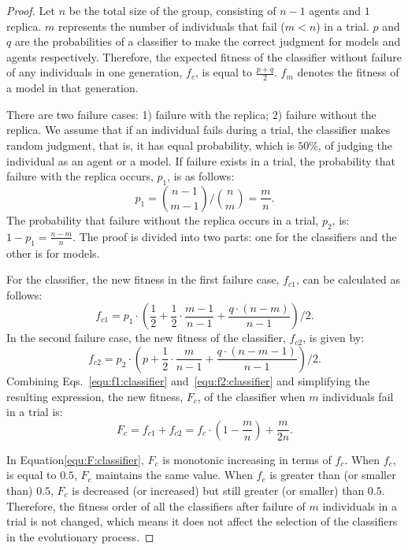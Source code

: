 \begin{proof}
Let $n$ be the total size of the group, consisting of $n-1$ agents and $1$ replica. $m$ represents the number of individuals that fail ($m<n$) in a trial. $p$ and $q$ are the probabilities of a classifier to make the correct judgment for models and agents respectively. Therefore, the expected fitness of the classifier without failure of any individuals in one generation, $f_c$, is equal to $\frac{p+q}{2}$. $f_m$ denotes the fitness of a model in that generation. 

There are two failure cases: 1) failure with the replica; 2) failure without the replica. We assume that if an individual fails during a trial, the classifier makes random judgment, that is, it has equal probability, which is $50\%$, of judging the individual as an agent or a model. If failure exists in a trial, the probability that failure with the replica occurs, $p_1$, is as follows:
\begin{equation}
{p_1} = {\binom{n-1}{m-1}} / {\binom{n}{m}} = \frac{m}{n}.
\end{equation}
The probability that failure without the replica occurs in a trial, $p_2$, is: $1 - p_1 = \frac{n-m}{n}$. The proof is divided into two parts: one for the classifiers and the other is for models.

For the classifier, the new fitness in the first failure case, $f_{c1}$, can be calculated as follows:
\begin{equation}\label{equ:f1:classifier}
{f_{c1}} = p_1 \cdot (\frac{1}{2} + \frac{1}{2} \cdot \frac{m-1}{n-1} + \frac{q \cdot (n-m)}{n-1}) /2.
\end{equation}
In the second failure case, the new fitness of the classifier, $f_{c2}$, is given by:
\begin{equation}\label{equ:f2:classifier}
{f_{c2}} = p_2 \cdot (p + \frac{1}{2} \cdot \frac{m}{n-1} + \frac{q \cdot (n-m-1)}{n-1}) / 2.
\end{equation}
Combining Eqs.~\eqref{equ:f1:classifier} and~\eqref{equ:f2:classifier} and simplifying the resulting expression, the new fitness, $F_c$, of the classifier when $m$ individuals fail in a trial is:
\begin{equation}\label{equ:F:classifier}
{F_c} = f_{c1} + f_{c2} = f_c \cdot (1-\frac{m}{n}) + \frac{m}{2n}.
\end{equation}

In Equation\eqref{equ:F:classifier}, $F_c$ is monotonic increasing in terms of $f_c$. When $f_c$, is equal to $0.5$, $F_c$ maintains the same value. When $f_c$ is greater than (or smaller than) $0.5$, $F_c$ is decreased (or increased) but still greater (or smaller) than $0.5$. Therefore, the fitness order of all the classifiers after failure of $m$ individuals in a trial is not changed, which means it does not affect the selection of the classifiers in the evolutionary process. 


\end{proof}
